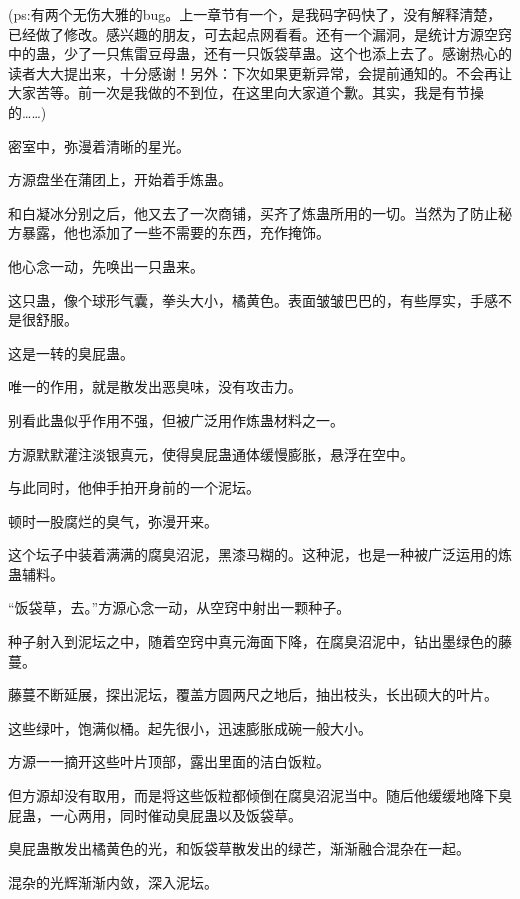 
\begin{this_body}



(ps:有两个无伤大雅的bug。上一章节有一个，是我码字码快了，没有解释清楚，已经做了修改。感兴趣的朋友，可去起点网看看。还有一个漏洞，是统计方源空窍中的蛊，少了一只焦雷豆母蛊，还有一只饭袋草蛊。这个也添上去了。感谢热心的读者大大提出来，十分感谢！另外：下次如果更新异常，会提前通知的。不会再让大家苦等。前一次是我做的不到位，在这里向大家道个歉。其实，我是有节操的……)

密室中，弥漫着清晰的星光。

方源盘坐在蒲团上，开始着手炼蛊。

和白凝冰分别之后，他又去了一次商铺，买齐了炼蛊所用的一切。当然为了防止秘方暴露，他也添加了一些不需要的东西，充作掩饰。

他心念一动，先唤出一只蛊来。

这只蛊，像个球形气囊，拳头大小，橘黄色。表面皱皱巴巴的，有些厚实，手感不是很舒服。

这是一转的臭屁蛊。

唯一的作用，就是散发出恶臭味，没有攻击力。

别看此蛊似乎作用不强，但被广泛用作炼蛊材料之一。

方源默默灌注淡银真元，使得臭屁蛊通体缓慢膨胀，悬浮在空中。

与此同时，他伸手拍开身前的一个泥坛。

顿时一股腐烂的臭气，弥漫开来。

这个坛子中装着满满的腐臭沼泥，黑漆马糊的。这种泥，也是一种被广泛运用的炼蛊辅料。

“饭袋草，去。”方源心念一动，从空窍中射出一颗种子。

种子射入到泥坛之中，随着空窍中真元海面下降，在腐臭沼泥中，钻出墨绿色的藤蔓。

藤蔓不断延展，探出泥坛，覆盖方圆两尺之地后，抽出枝头，长出硕大的叶片。

这些绿叶，饱满似桶。起先很小，迅速膨胀成碗一般大小。

方源一一摘开这些叶片顶部，露出里面的洁白饭粒。

但方源却没有取用，而是将这些饭粒都倾倒在腐臭沼泥当中。随后他缓缓地降下臭屁蛊，一心两用，同时催动臭屁蛊以及饭袋草。

臭屁蛊散发出橘黄色的光，和饭袋草散发出的绿芒，渐渐融合混杂在一起。

混杂的光辉渐渐内敛，深入泥坛。


\end{this_body}
